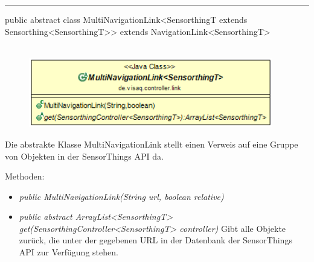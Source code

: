 \rule{\textwidth}{0.4pt}
public abstract class MultiNavigationLink<SensorthingT extends Sensorthing<SensorthingT>> extends NavigationLink<SensorthingT>
\\\\
\begin{minipage}{0.5\textwidth}
    \begin{figure}[H]
        {\centering\includegraphics[width=0.95\textwidth]{media/backend/controller/classes/MultiNavigationLink.png}}
    \end{figure}
    \end{minipage} \hfill
\begin{minipage}{0.5\textwidth}
    Die abstrakte Klasse MultiNavigationLink stellt einen Verweis auf eine Gruppe von Objekten in der \gls{SensorThings API} da.
\end{minipage}

Methoden:
\begin{itemize}
    \item \emph{public MultiNavigationLink(String url, boolean relative)}
    \relativeDescription
    \item \emph{public abstract ArrayList<SensorthingT> get(SensorthingController<SensorthingT> controller)}
    Gibt alle Objekte zurück, die unter der gegebenen URL in der Datenbank der \gls{SensorThings API} zur Verfügung stehen.
\end{itemize}


